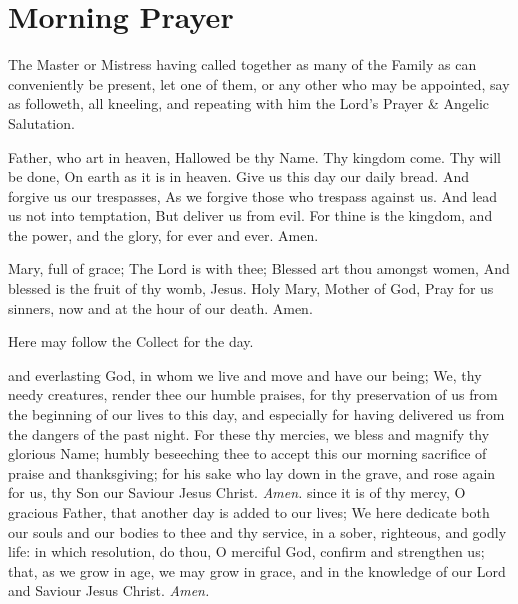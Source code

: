 \fancyhead[RO,LE]{}\label{Family}
\fancyhead[RE,LO]{}
\section*{Morning Prayer}
\begin{rubric}
    The Master or Mistress having called together as many of the Family as can conveniently be present, let one of them, or any other who may be appointed, say as followeth, all kneeling, and repeating with him the Lord's Prayer \& Angelic Salutation.
\end{rubric}
 Father, who art in heaven, Hallowed be thy Name. Thy kingdom come. Thy will be done, On earth as it is in heaven. Give us this day our daily bread. And forgive us our trespasses, As we forgive those who trespass against us. And lead us not into temptation, But deliver us from evil. For thine is the kingdom, and the power, and the glory, for ever and ever. Amen.\par
{} Mary, full of grace; The Lord is with thee; Blessed art thou amongst women, And blessed is the fruit of thy womb, Jesus. Holy Mary, Mother of God, Pray for us sinners, now and at the hour of our death. Amen.
\begin{rubric}
    Here may follow the Collect for the day.
\end{rubric}
 and everlasting God, in whom we live and move and have our being; We, thy needy creatures, render thee our humble praises, for thy preservation of us from the beginning of our lives to this day, and especially for having delivered us from the dangers of the past night. For these thy mercies, we bless and magnify thy glorious Name; humbly beseeching thee to accept this our morning sacrifice of praise and thanksgiving; for his sake who lay down in the grave, and rose again for us, thy Son our Saviour Jesus Christ. \textit{Amen.}
 since it is of thy mercy, O gracious Father, that another day is added to our lives; We here dedicate both our souls and our bodies to thee and thy service, in a sober, righteous, and godly life: in which resolution, do thou, O merciful God, confirm and strengthen us; that, as we grow in age, we may grow in grace, and in the knowledge of our Lord and Saviour Jesus Christ. \textit{Amen.}

